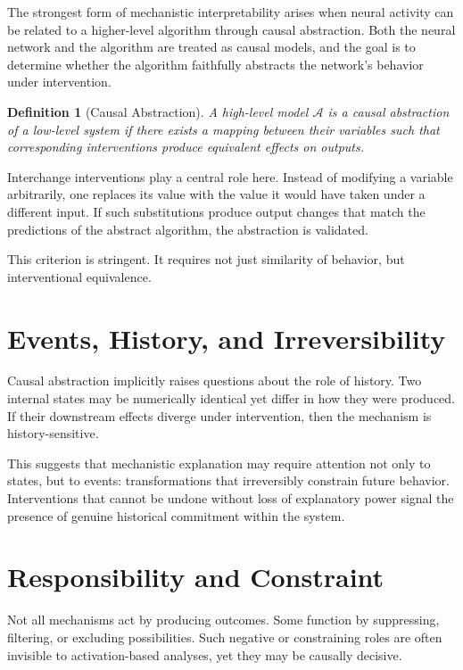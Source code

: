 \documentclass[11pt]{article}
\newtheorem{definition}{Definition}
\newcommand{\Alg}{\mathcal{A}}
\begin{document}
The strongest form of mechanistic interpretability arises when neural activity
can be related to a higher-level algorithm through causal abstraction. Both the
neural network and the algorithm are treated as causal models, and the goal is
to determine whether the algorithm faithfully abstracts the network’s behavior
under intervention.

\begin{definition}[Causal Abstraction]
A high-level model $\Alg$ is a causal abstraction of a low-level system if there
exists a mapping between their variables such that corresponding interventions
produce equivalent effects on outputs.
\end{definition}

Interchange interventions play a central role here. Instead of modifying a
variable arbitrarily, one replaces its value with the value it would have taken
under a different input. If such substitutions produce output changes that match
the predictions of the abstract algorithm, the abstraction is validated.

This criterion is stringent. It requires not just similarity of behavior, but
interventional equivalence.

\section{Events, History, and Irreversibility}

Causal abstraction implicitly raises questions about the role of history. Two
internal states may be numerically identical yet differ in how they were
produced. If their downstream effects diverge under intervention, then the
mechanism is history-sensitive.

This suggests that mechanistic explanation may require attention not only to
states, but to events: transformations that irreversibly constrain future
behavior. Interventions that cannot be undone without loss of explanatory power
signal the presence of genuine historical commitment within the system.

\section{Responsibility and Constraint}

Not all mechanisms act by producing outcomes. Some function by suppressing,
filtering, or excluding possibilities. Such negative or constraining roles are
often invisible to activation-based analyses, yet they may be causally decisive.
\end{document}
